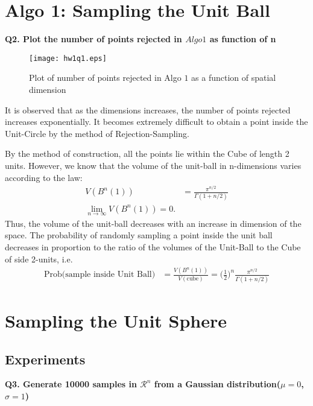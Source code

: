\documentclass[11pt]{article}
\begin{document}


\section{Algo 1: Sampling the Unit Ball}

\textbf{Q2. Plot the number of points rejected in $Algo 1$ as function of n}

\begin{figure}[h!]
\centering
\texttt{[image: hw1q1.eps]}\\
\caption{Plot of number of points rejected in Algo $1$ as a function of spatial dimension}
\label{fig:que2}
\end{figure}


It is observed that as the dimensions increases, the number of points rejected increases exponentially. It becomes extremely difficult to obtain a point inside the Unit-Circle by the method of Rejection-Sampling. 

By the method of construction, all the points lie within the Cube of length 2 units. However, we know that the volume of the unit-ball in n-dimensions varies according to the law:
\begin{align*}
V(B^n(1)) &= \frac{\pi^{n/2}}{\Gamma(1+n/2)}\\
\lim_{n \rightarrow \infty}V(B^n(1)) = 0.
\end{align*}
Thus, the volume of the unit-ball decreases with an increase in dimension of the space. The probability of randomly sampling a point inside the unit ball decreases in proportion to the ratio of the volumes of the Unit-Ball to the Cube of side 2-units, i.e.
\begin{align*}
\text{Prob(sample inside Unit Ball)} &= \frac{V(B^n(1))}{V(\text{cube})} = \big(\frac{1}{2}\big)^n \frac{\pi^{n/2}}{\Gamma(1+n/2)}
\end{align*}

\hrulefill

\section{Sampling the Unit Sphere}

\subsection{Experiments}

\textbf{Q3. Generate 10000 samples in $\mathcal{R}^n$ from a Gaussian distribution($\mu=0$,$\sigma=1$)}
\end{document}
